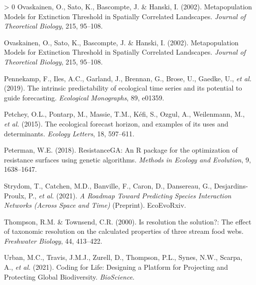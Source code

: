 \documentclass[11pt]{article}
\newlength{\cslhangindent}
\newenvironment{CSLReferences}[3] %
 {%
  \setlength{\parindent}{0pt}
  \ifodd #1 \everypar{\setlength{\hangindent}{\cslhangindent}}\ignorespaces\fi
  \ifnum #2 > 0
  \setlength{\parskip}{#2\baselineskip}
  \fi
 }%
 {}
\begin{document}
\begin{CSLReferences}{1}{0}
\leavevmode\hypertarget{ref-Ovaskainen2002MetMod}{}%
Ovaskainen, O., Sato, K., Bascompte, J. \& Hanski, I. (2002).
Metapopulation Models for Extinction Threshold in Spatially Correlated
Landscapes. \emph{Journal of Theoretical Biology}, 215, 95--108.

\leavevmode\hypertarget{ref-Ovaskainen2002MetMod}{}%
Ovaskainen, O., Sato, K., Bascompte, J. \& Hanski, I. (2002).
Metapopulation Models for Extinction Threshold in Spatially Correlated
Landscapes. \emph{Journal of Theoretical Biology}, 215, 95--108.

\leavevmode\hypertarget{ref-Pennekamp2019IntPre}{}%
Pennekamp, F., Iles, A.C., Garland, J., Brennan, G., Brose, U., Gaedke,
U., \emph{et al.} (2019). The intrinsic predictability of ecological
time series and its potential to guide forecasting. \emph{Ecological
Monographs}, 89, e01359.

\leavevmode\hypertarget{ref-Petchey2015EcoFor}{}%
Petchey, O.L., Pontarp, M., Massie, T.M., Kéfi, S., Ozgul, A.,
Weilenmann, M., \emph{et al.} (2015). The ecological forecast horizon,
and examples of its uses and determinants. \emph{Ecology Letters}, 18,
597--611.

\leavevmode\hypertarget{ref-Peterman2018ResRP}{}%
Peterman, W.E. (2018). ResistanceGA: An R package for the optimization
of resistance surfaces using genetic algorithms. \emph{Methods in
Ecology and Evolution}, 9, 1638--1647.

\leavevmode\hypertarget{ref-Strydom2021RoaPre}{}%
Strydom, T., Catchen, M.D., Banville, F., Caron, D., Dansereau, G.,
Desjardins-Proulx, P., \emph{et al.} (2021). \emph{A Roadmap Toward
Predicting Species Interaction Networks (Across Space and Time)}
(Preprint). EcoEvoRxiv.

\leavevmode\hypertarget{ref-Thompson2000ResSol}{}%
Thompson, R.M. \& Townsend, C.R. (2000). Is resolution the solution?:
The effect of taxonomic resolution on the calculated properties of three
stream food webs. \emph{Freshwater Biology}, 44, 413--422.

\leavevmode\hypertarget{ref-Urban2021CodLif}{}%
Urban, M.C., Travis, J.M.J., Zurell, D., Thompson, P.L., Synes, N.W.,
Scarpa, A., \emph{et al.} (2021). Coding for Life: Designing a Platform
for Projecting and Protecting Global Biodiversity. \emph{BioScience}.

\end{CSLReferences}
\end{document}
